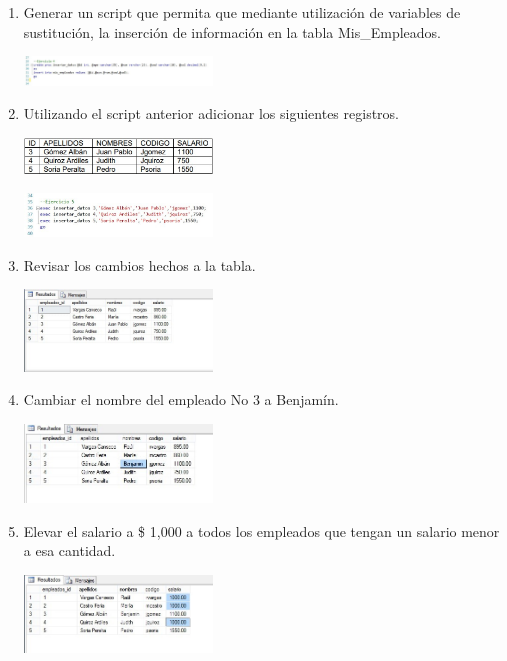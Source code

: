 \begin{enumerate}[1.]
\begin{center}
	\end{center}
	\item Generar un script que permita que mediante utilización de variables de sustitución, la inserción de información en la tabla Mis\_Empleados.
	\begin{center}
	\includegraphics[width=5cm]{./Imagenes/img4} 
	\end{center}
	\item Utilizando el script anterior adicionar los siguientes registros.
	\begin{center}
	\includegraphics[width=5cm]{./Imagenes/imagen0105} 
	\end{center}
	\begin{center}
	\includegraphics[width=5cm]{./Imagenes/img5} 
	\end{center}
	\item Revisar los cambios hechos a la tabla.
	\begin{center}
	\includegraphics[width=5cm]{./Imagenes/img6} 
	\end{center}
	\item Cambiar el nombre del empleado No 3 a Benjamín.
	\begin{center}
	\includegraphics[width=5cm]{./Imagenes/img7} 
	\end{center}
	\item Elevar el salario a \$ 1,000 a todos los empleados que tengan un salario menor a esa cantidad.
	\begin{center}
	\includegraphics[width=5cm]{./Imagenes/img8} 

\end{center}
\end{enumerate}
